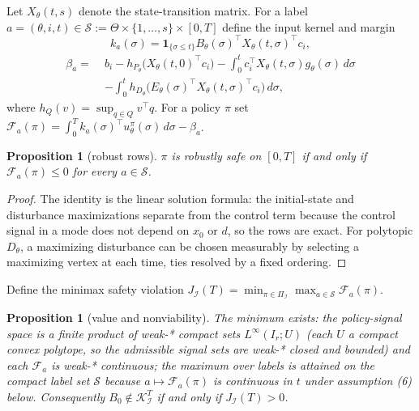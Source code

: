 \documentclass[10pt,twocolumn]{article}
\theoremstyle{plain}
\newtheorem{proposition}[theorem]{Proposition}
\theoremstyle{definition}
\theoremstyle{remark}
\begin{document}
Let \(X_\theta(t,s)\) denote the state-transition matrix. For a label
\(a = (\theta, i, t) \in \mathscr{S} := \Theta \times \{1,\dots,s\} \times
[0,T]\) define the input kernel and margin
\[
k_a(\sigma) = \mathbf{1}_{\{\sigma \le t\}} B_\theta(\sigma)^\top
X_\theta(t,\sigma)^\top c_i,
\]
\begin{align*}
\beta_a = \;& b_i - h_{P_\theta}\!\bigl(X_\theta(t,0)^\top c_i\bigr)
- \int_0^t c_i^\top X_\theta(t,\sigma) g_\theta(\sigma)\, d\sigma\\
& - \int_0^t h_{D_\theta}\!\bigl(E_\theta(\sigma)^\top
X_\theta(t,\sigma)^\top c_i\bigr)\, d\sigma,
\end{align*}
where \(h_Q(v) = \sup_{q \in Q} v^\top q\). For a policy \(\pi\) set
\(\mathcal{F}_a(\pi) = \int_0^T k_a(\sigma)^\top u^\pi_\theta(\sigma)\,
d\sigma - \beta_a\).

\begin{proposition}[robust rows]\label{prop:rows}
\(\pi\) is robustly safe on \([0,T]\) if and only if
\(\mathcal{F}_a(\pi) \le 0\) for every \(a \in \mathscr{S}\).
\end{proposition}

\begin{proof}
The identity is the linear solution formula: the initial-state and
disturbance maximizations separate from the control term because the
control signal in a mode does not depend on \(x_0\) or \(d\), so the
rows are exact. For polytopic \(D_\theta\), a maximizing disturbance
can be chosen measurably by selecting a maximizing vertex at each time,
ties resolved by a fixed ordering.
\end{proof}

Define the minimax safety violation
\(J_{\mathcal{I}}(T) = \min_{\pi \in \Pi_{\mathcal{I}}} \max_{a \in
\mathscr{S}} \mathcal{F}_a(\pi)\).

\begin{proposition}[value and nonviability]\label{prop:value}
The minimum exists: the policy-signal space is a finite product of
weak-* compact sets \(L^\infty(I_r; U)\) (each \(U\) a compact convex
polytope, so the admissible signal sets are weak-* closed and bounded) and
each \(\mathcal{F}_a\) is weak-* continuous; the maximum over labels is
attained on the compact label set \(\mathscr{S}\) because
\(a \mapsto \mathcal{F}_a(\pi)\) is continuous in \(t\) under
assumption (6) below. Consequently
\(B_0 \notin \mathcal{K}_{\mathcal{I}}^T\) if and only if
\(J_{\mathcal{I}}(T) > 0\).
\end{proposition}
\end{document}
